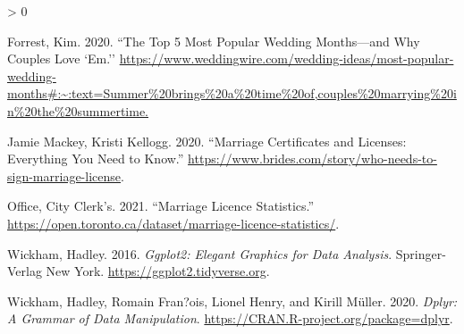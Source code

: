 \documentclass[
]{article}
\newlength{\cslhangindent}
\newenvironment{CSLReferences}[2] %
 {%
  \setlength{\parindent}{0pt}
  \ifodd #1 \everypar{\setlength{\hangindent}{\cslhangindent}}\ignorespaces\fi
  \ifnum #2 > 0
  \setlength{\parskip}{#2\baselineskip}
  \fi
 }%
 {}
\begin{document}
\hypertarget{refs}{}
\begin{CSLReferences}{1}{0}
\leavevmode\hypertarget{ref-Popular}{}%
Forrest, Kim. 2020. {``The Top 5 Most Popular Wedding Months---and Why Couples Love `Em.''} \url{https://www.weddingwire.com/wedding-ideas/most-popular-wedding-months\#:~:text=Summer\%20brings\%20a\%20time\%20of,couples\%20marrying\%20in\%20the\%20summertime.}

\leavevmode\hypertarget{ref-Define}{}%
Jamie Mackey, Kristi Kellogg. 2020. {``Marriage Certificates and Licenses: Everything You Need to Know.''} \url{https://www.brides.com/story/who-needs-to-sign-marriage-license}.

\leavevmode\hypertarget{ref-datasource}{}%
Office, City Clerk's. 2021. {``Marriage Licence Statistics.''} \url{https://open.toronto.ca/dataset/marriage-licence-statistics/}.

\leavevmode\hypertarget{ref-ggplot}{}%
Wickham, Hadley. 2016. \emph{Ggplot2: Elegant Graphics for Data Analysis}. Springer-Verlag New York. \url{https://ggplot2.tidyverse.org}.

\leavevmode\hypertarget{ref-dplyr}{}%
Wickham, Hadley, Romain Fran?ois, Lionel Henry, and Kirill Müller. 2020. \emph{Dplyr: A Grammar of Data Manipulation}. \url{https://CRAN.R-project.org/package=dplyr}.

\end{CSLReferences}
\end{document}
